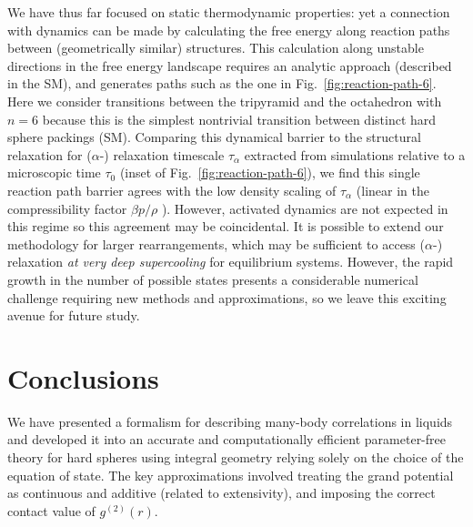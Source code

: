 \documentclass[11pt,twoside]{report}
\begin{document}
We have thus far focused on static thermodynamic properties: yet a connection with dynamics can be made by calculating the free energy along reaction paths between (geometrically similar) structures.
This calculation along unstable directions in the free energy landscape requires an analytic approach (described in the SM), and generates paths such as the one in Fig.\ \ref{fig:reaction-path-6}.
Here we consider transitions between the tripyramid and the octahedron with $n=6$ because this is the simplest nontrivial transition between distinct hard sphere packings (SM).
Comparing this dynamical barrier to the structural relaxation for ($\alpha$-) relaxation timescale $\tau_\alpha$ extracted from simulations relative to a microscopic time $\tau_0$ (inset of Fig.\ \ref{fig:reaction-path-6}), we find this single reaction path barrier agrees with the low density scaling of $\tau_\alpha$ (linear in the compressibility factor $\beta p / \rho$ \cite{BerthierPRE2009}).
However, activated dynamics are not expected in this regime so this agreement may be coincidental.
It is possible to extend our methodology for larger rearrangements, which may be sufficient to access ($\alpha$-) relaxation \emph{at very deep supercooling} for equilibrium systems.
However, the rapid growth in the number of possible states presents a considerable numerical challenge requiring new methods and approximations, so we leave this exciting avenue for future study.

\section{Conclusions}

We have presented a formalism for describing many-body correlations in liquids and developed it into an accurate and computationally efficient parameter-free theory for hard spheres using integral geometry relying solely on the choice of the equation of state.
The key approximations involved treating the grand potential as continuous and additive (related to extensivity), and imposing the correct contact value of $g^{(2)}(r)$.
\end{document}
